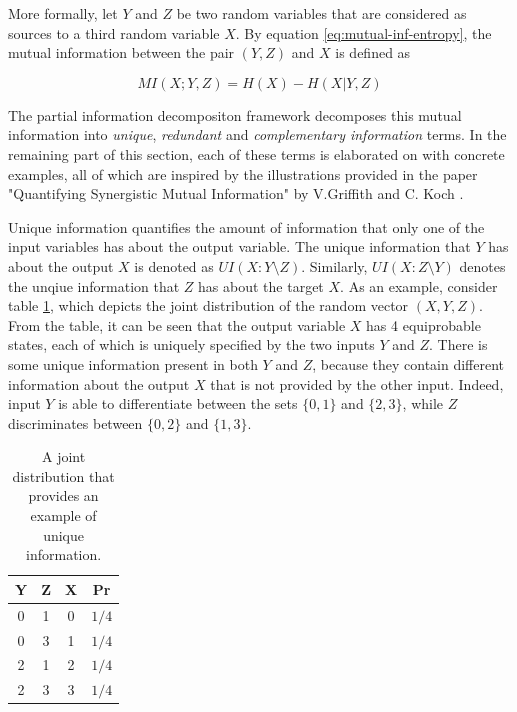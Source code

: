 \documentclass[12pt]{article}
\begin{document}
More formally, let $Y$ and $Z$ be two random variables that are considered as sources to a third random variable $X$. By equation \ref{eq:mutual-inf-entropy}, the mutual information between the pair $(Y,Z)$ and $X$ is defined as 

$$MI(X;Y,Z) = H(X) - H(X|Y,Z)$$

The partial information decompositon framework decomposes this mutual information into \textit{unique}, \textit{redundant} and \textit{complementary information} terms. In the remaining part of this section, each of these terms is elaborated on with concrete examples, all of which are inspired by the illustrations provided in the paper "Quantifying Synergistic Mutual Information" by V.Griffith and C. Koch \cite{pid-synergy}.

Unique information quantifies the amount of information that only one of the input variables has about the output variable. The unique information that $Y$ has about the output $X$ is denoted as $UI(X:Y \setminus Z)$. Similarly, $UI(X:Z \setminus Y)$ denotes the unqiue information that $Z$ has about the target $X$. As an example, consider table \ref{table:1}, which depicts the joint distribution of the random vector $(X,Y,Z)$. From the table, it can be seen that the output variable $X$ has 4 equiprobable states, each of which is uniquely specified by the two inputs $Y$ and $Z$. There is some unique information present in both $Y$ and $Z$, because they contain different information about the output $X$ that is not provided by the other input. Indeed, input $Y$ is able to differentiate between the sets $\{0,1\}$ and $\{2,3\}$, while $Z$ discriminates between $\{0, 2\}$ and $\{1,3\}$.

\begin{table}[h!]
\centering
\caption{A joint distribution that provides an example of unique information.}
\begin{tabular}{|c c |c|c|}
	\hline
	Y & Z & X & Pr\\ 
	\hline
	0 & 1 & 0 & $1/4$ \\
	0 & 3 & 1 & $1/4$ \\
	2 & 1 & 2 & $1/4$ \\
	2 & 3 & 3 & $1/4$ \\
	\hline
\end{tabular}
\label{table:1}
\end{table}
\end{document}
